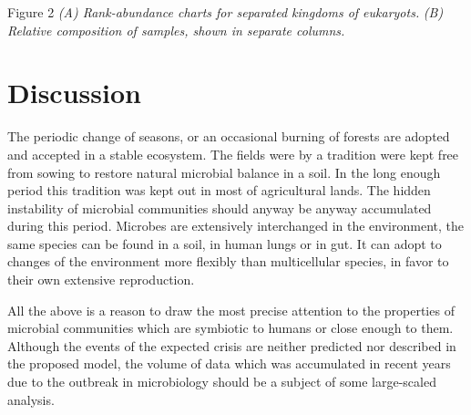 \documentclass[a4paper]{article}
\begin{document}
Figure 2 \textit{(A) Rank-abundance charts for separated kingdoms of eukaryots.}
\textit{(B) Relative composition of samples, shown in separate columns.}







\section*{Discussion}


The periodic change of seasons, or an occasional burning of forests are adopted and accepted in a stable ecosystem. The fields were by a tradition were kept free from sowing to restore natural microbial balance in a soil. In the long enough period this tradition was kept out in most of agricultural lands. The hidden instability of microbial communities should anyway be anyway accumulated during this period. Microbes are extensively interchanged in the environment, the same species can be found in a soil, in human lungs or in gut. It can adopt to changes of the environment more flexibly than multicellular species, in favor to their own extensive reproduction.

All the above is a reason to draw the most precise attention to the properties of microbial communities which are symbiotic to humans or close enough to them. Although the events of the expected crisis are neither predicted nor described in the proposed model, the volume of data which was accumulated in recent years due to the outbreak in microbiology should be a subject of some large-scaled analysis. 

\end{document}

